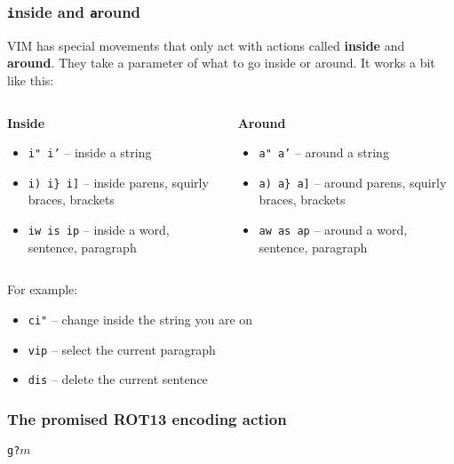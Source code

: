 \documentclass{lug}
\begin{document}
\begin{frame}
    \frametitle{\texttt{i}nside and \texttt{a}round}
    VIM has special movements that only act with actions called \textbf{inside}
    and \textbf{around}. They take a parameter of what to go inside or around.
    It works a bit like this:

    \bigskip

    \begin{columns}
        \begin{column}{0.5\textwidth}
            {\centering \textbf{Inside} \par}
            \begin{itemize}
                \item \texttt{i" i'} -- inside a string
                \item \texttt{i) i\} i]} -- inside parens, squirly braces,
                    brackets
                \item \texttt{iw is ip} -- inside a word, sentence, paragraph
            \end{itemize}
        \end{column}
        \begin{column}{0.5\textwidth}
            {\centering \textbf{Around} \par}
            \begin{itemize}
                \item \texttt{a" a'} -- around a string
                \item \texttt{a) a\} a]} -- around parens, squirly braces,
                    brackets
                \item \texttt{aw as ap} -- around a word, sentence, paragraph
            \end{itemize}
        \end{column}
    \end{columns}

    \medskip

    For example:
    \begin{itemize}
        \item \texttt{ci"} -- change inside the string you are on
        \item \texttt{vip} -- select the current paragraph
        \item \texttt{dis} -- delete the current sentence
    \end{itemize}
\end{frame}

\begin{frame}
    \frametitle{The promised ROT13 encoding action}

    \Huge
    \centering

    \texttt{g?$m$}
\end{frame}
\end{document}
